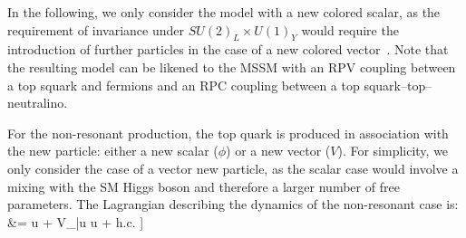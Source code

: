 % 
In the following, we only consider the model with a new colored scalar, as the requirement of invariance
under $SU(2)_L \times U(1)_Y$ would require the introduction of further particles in the case of a new colored vector~\cite{Boucheneb:2014wza}.
Note that the resulting model can be likened to the MSSM with
an RPV coupling between a top squark and fermions and an RPC coupling
between a top squark--top--neutralino.


\label{sec:NonResonantProd}

For the non-resonant production, the top quark is produced in association with the new particle:
either a new scalar ($\phi$) or a new vector ($V$). For simplicity, we only consider the case of a vector new particle, 
as the scalar case would involve a mixing with the SM Higgs boson and therefore a larger number of free parameters. 
The Lagrangian describing the dynamics of the non-resonant case is: 
\be\label{eq:lagrangianNonResonantVector}\bsp
\lag &=
\bigg[
\phi \bar u \Big[a^0_{FC}\!+\!b^0_{FC} \gamma_5 \Big] u \!+\!
V_\mu \bar u \gmu {} u  
%
+ \rm h.c. 
\bigg] 
\esp\ee

